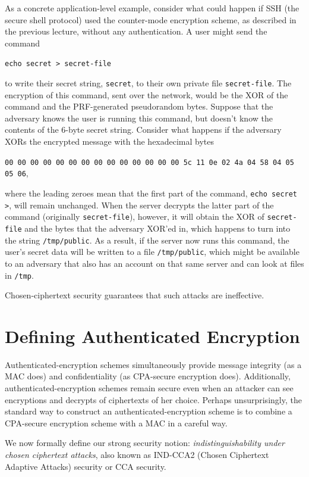As a concrete application-level example, consider what could
happen if SSH (the secure shell protocol) used the counter-mode
encryption scheme, as described in the previous lecture, without any
authentication.  A user might send the command
\begin{center}
\texttt{echo secret > secret-file}
\end{center}
to write their secret string,
\texttt{secret}, to their own private file \texttt{secret-file}.
The encryption of this command, sent over the network, would be the XOR
of the command and the PRF-generated pseudorandom bytes.  Suppose that
the adversary knows the user is running this command, but doesn't know
the contents of the 6-byte secret string.  Consider what
happens if the adversary XORs the encrypted message with the hexadecimal
bytes
\begin{center}
\texttt{00 00 00 00 00 00 00 00 00 00 00 00 00 00 5c 11 0e 02 4a
04 58 04 05 05 06},
\end{center}
where the leading zeroes mean that the first part of the
command, \texttt{echo secret >}, will remain unchanged.  When the server
decrypts the latter part of the command (originally \texttt{secret-file}),
however, it will obtain the XOR of \texttt{secret-file} and the bytes that
the adversary XOR'ed in, which happens to turn into the string \texttt{/tmp/public}.
As a result, if the server now runs this command, the user's secret data
will be written to a file \texttt{/tmp/public}, which might be available
to an adversary that also has an account on that same server and can look
at files in \texttt{/tmp}.

Chosen-ciphertext security guarantees that such attacks are ineffective.

\section{Defining Authenticated Encryption}

Authenticated-encryption schemes simultaneously provide message 
integrity (as a MAC does) and confidentiality (as CPA-secure encryption does).
Additionally, authenticated-encryption schemes remain secure even when 
an attacker can see encryptions and decrypts of ciphertexts of her choice.
Perhaps unsurprisingly, the standard way to construct an authenticated-encryption
scheme is to combine a CPA-secure encryption scheme with a MAC in a careful way.

We now formally define our strong security notion:
\emph{indistinguishability under chosen ciphertext attacks}, 
also known as IND-CCA2 (Chosen Ciphertext Adaptive Attacks) security or CCA security.

